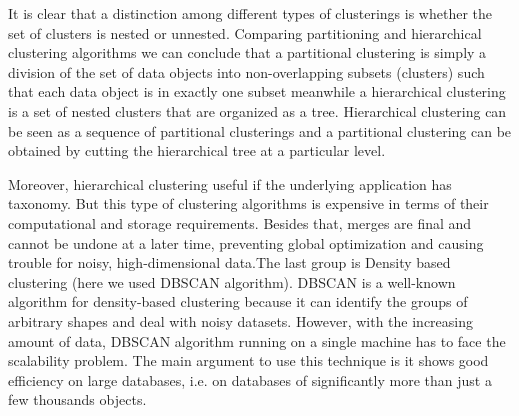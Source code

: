 \documentclass[a4paper,12pt,fleqn]{article}
\begin{document}
It is clear that a distinction among different types of clusterings is whether the set of clusters is nested or unnested. Comparing partitioning and hierarchical clustering algorithms we can conclude that a partitional clustering is simply a division of the set of data objects into non-overlapping subsets (clusters) such that each data object is in exactly one subset meanwhile a hierarchical clustering is a set of nested clusters that are organized as a tree. Hierarchical clustering can be seen as a sequence of partitional clusterings and a partitional clustering can be obtained by cutting the hierarchical tree at a particular level.

Moreover, hierarchical clustering useful if the underlying application has taxonomy. But this type of clustering algorithms is expensive in terms of their computational and storage requirements. Besides that, merges are final and cannot be undone at a later time, preventing global optimization and causing trouble for noisy, high-dimensional data.The last group is Density based clustering (here we used DBSCAN algorithm). DBSCAN is a well-known algorithm for density-based clustering because it can identify the groups of arbitrary shapes and deal with noisy datasets. However, with the increasing amount of data, DBSCAN algorithm running on a single machine has to face the scalability problem. The main argument to use this technique is it shows good efficiency on large databases, i.e. on databases of significantly more than just a few thousands objects.
\end{document}
